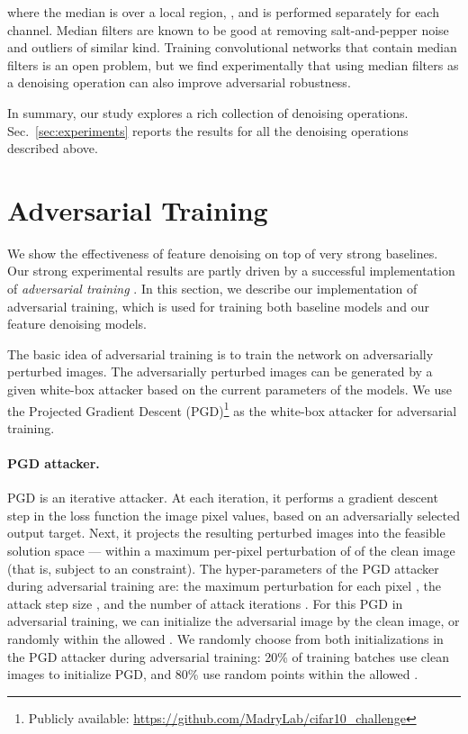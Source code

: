 \documentclass[10pt,twocolumn,letterpaper]{article}
\begin{document}
where the median is over a local region, , and is performed separately for each channel.
Median filters are known to be good at removing salt-and-pepper noise and outliers of similar kind. Training convolutional networks that contain median filters is an open problem, but we find experimentally that using median filters as a denoising operation can also improve adversarial robustness.

\vspace{1em}
In summary, our study explores a rich collection of denoising operations. Sec.~\ref{sec:experiments} reports the results for all the denoising operations described above.

\section{Adversarial Training}\label{sec:advtrain}

We show the effectiveness of feature denoising on top of very strong baselines. Our strong experimental results are partly driven by a successful implementation of \emph{adversarial training} \cite{Goodfellow2015,Madry2018}. In this section, we describe our implementation of adversarial training, which is used for training both baseline models and our feature denoising models.

The basic idea of adversarial training \cite{Goodfellow2015,Madry2018} is to train the network on adversarially perturbed images. The adversarially perturbed images can be generated by a given white-box attacker based on the current parameters of the models. We use the Projected Gradient Descent (PGD)\footnote{Publicly available: \fontsize{5.9pt}{1em}\selectfont \url{https://github.com/MadryLab/cifar10_challenge}} \cite{Madry2018} as the white-box attacker for adversarial training. 

\paragraph{PGD attacker.}
PGD is an iterative attacker.
At each iteration, it performs a gradient descent step in the loss function \wrt the image pixel values, based on an adversarially selected output target.
Next, it projects the resulting perturbed images into the feasible solution space --- within a maximum per-pixel perturbation of  of the clean image (that is, subject to an  constraint). The hyper-parameters of the PGD attacker during adversarial training are: the maximum perturbation for each pixel , the attack step size , and the number of attack iterations .
For this PGD in adversarial training, we can initialize the adversarial image by the clean image, or randomly within the allowed  \cite{Madry2018}. We randomly choose from both initializations in the PGD attacker during adversarial training: 20\% of training batches use clean images to initialize PGD, and 80\% use random points within the allowed .
\end{document}
